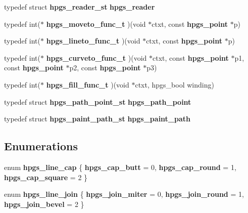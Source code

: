 \begin{DoxyCompactItemize}
\item 
typedef struct {\bf hpgs\_\-reader\_\-st} {\bfseries hpgs\_\-reader}\label{group__reader_ga9fe73110cf6f76ff88160a677e4a5c4e}

\item 
typedef int($\ast$ {\bfseries hpgs\_\-moveto\_\-func\_\-t} )(void $\ast$ctxt, const {\bf hpgs\_\-point} $\ast$p)\label{group__font_gadb482453b858b6b9561c76752f3e0e46}

\item 
typedef int($\ast$ {\bfseries hpgs\_\-lineto\_\-func\_\-t} )(void $\ast$ctxt, const {\bf hpgs\_\-point} $\ast$p)\label{group__font_gaaa432603ef5a4185c0e7d23e280a45b8}

\item 
typedef int($\ast$ {\bfseries hpgs\_\-curveto\_\-func\_\-t} )(void $\ast$ctxt, const {\bf hpgs\_\-point} $\ast$p1, const {\bf hpgs\_\-point} $\ast$p2, const {\bf hpgs\_\-point} $\ast$p3)\label{group__font_ga0b886c68898c98c2aaf7536f97d7bcc5}

\item 
typedef int($\ast$ {\bfseries hpgs\_\-fill\_\-func\_\-t} )(void $\ast$ctxt, hpgs\_\-bool winding)\label{group__font_gabad7cbae9e3d41a823f63520ab61c167}

\item 
typedef struct {\bf hpgs\_\-path\_\-point\_\-st} {\bfseries hpgs\_\-path\_\-point}\label{group__path_gafc59f1822b1f6783bfcce4c824b911f4}

\item 
typedef struct {\bf hpgs\_\-paint\_\-path\_\-st} {\bfseries hpgs\_\-paint\_\-path}\label{group__path_ga13ce072f19c7638345701bd3fb2f6f31}

\end{DoxyCompactItemize}
\subsection*{Enumerations}
\begin{DoxyCompactItemize}
\item 
enum {\bf hpgs\_\-line\_\-cap} \{ {\bf hpgs\_\-cap\_\-butt} =  0, 
{\bf hpgs\_\-cap\_\-round} =  1, 
{\bf hpgs\_\-cap\_\-square} =  2
 \}
\item 
enum {\bf hpgs\_\-line\_\-join} \{ {\bf hpgs\_\-join\_\-miter} =  0, 
{\bf hpgs\_\-join\_\-round} =  1, 
{\bf hpgs\_\-join\_\-bevel} =  2
 \}
\end{DoxyCompactItemize}
